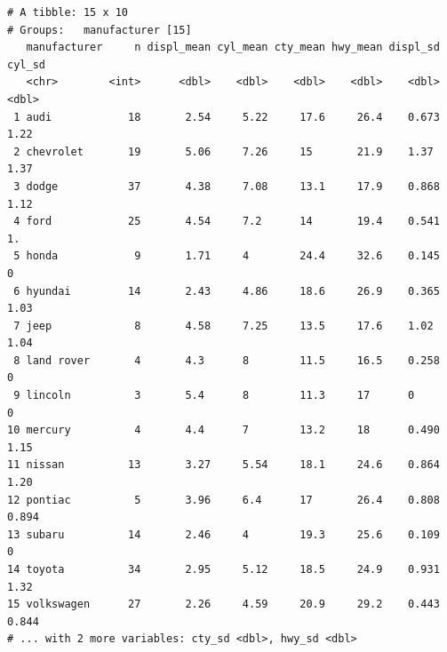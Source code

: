 \documentclass[
  11pt,
]{krantz}
\begin{document}
\begin{verbatim}
# A tibble: 15 x 10
# Groups:   manufacturer [15]
   manufacturer     n displ_mean cyl_mean cty_mean hwy_mean displ_sd cyl_sd
   <chr>        <int>      <dbl>    <dbl>    <dbl>    <dbl>    <dbl>  <dbl>
 1 audi            18       2.54     5.22     17.6     26.4    0.673  1.22 
 2 chevrolet       19       5.06     7.26     15       21.9    1.37   1.37 
 3 dodge           37       4.38     7.08     13.1     17.9    0.868  1.12 
 4 ford            25       4.54     7.2      14       19.4    0.541  1.   
 5 honda            9       1.71     4        24.4     32.6    0.145  0    
 6 hyundai         14       2.43     4.86     18.6     26.9    0.365  1.03 
 7 jeep             8       4.58     7.25     13.5     17.6    1.02   1.04 
 8 land rover       4       4.3      8        11.5     16.5    0.258  0    
 9 lincoln          3       5.4      8        11.3     17      0      0    
10 mercury          4       4.4      7        13.2     18      0.490  1.15 
11 nissan          13       3.27     5.54     18.1     24.6    0.864  1.20 
12 pontiac          5       3.96     6.4      17       26.4    0.808  0.894
13 subaru          14       2.46     4        19.3     25.6    0.109  0    
14 toyota          34       2.95     5.12     18.5     24.9    0.931  1.32 
15 volkswagen      27       2.26     4.59     20.9     29.2    0.443  0.844
# ... with 2 more variables: cty_sd <dbl>, hwy_sd <dbl>
\end{verbatim}
\end{document}

